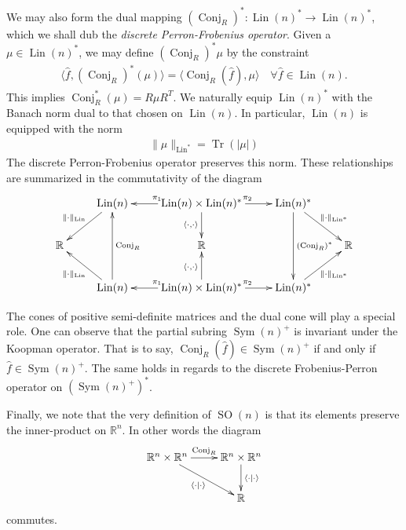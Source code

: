 \documentclass[12pt]{amsart}
\newcommand{\R}{\ensuremath{\mathbb{R}}}
\DeclareMathOperator{\SO}{SO}
\DeclareMathOperator{\Sym}{Sym}
\DeclareMathOperator{\Lin}{Lin}
\DeclareMathOperator{\Tr}{Tr}
\DeclareMathOperator{\Conj}{Conj}
\begin{document}
We may also form the dual mapping $(\Conj_R)^*: \Lin(n)^* \to \Lin(n)^*$,
which we shall dub the \emph{discrete Perron-Frobenius operator}.
Given a $\mu \in \Lin(n)^*$, we may define $(\Conj_{R})^* \mu$ by the constraint
\begin{align*}
	\langle \hat{f} , (\Conj_R)^*(\mu) \rangle = \langle \Conj_R(\hat{f}) , \mu \rangle \quad \forall \hat{f} \in \Lin(n).
\end{align*}
This implies $\Conj_R^*(\mu) = R \mu R^T$.
We naturally equip $\Lin(n)^*$ with the Banach norm dual to that chosen on $\Lin(n)$.
In particular, $\Lin(n)$ is  equipped with the norm
\begin{align*}
	\| \mu \|_{\Lin^*} = \Tr(  |\mu| )
\end{align*}
The discrete Perron-Frobenius operator preserves this norm.
These relationships are summarized in the commutativity of the diagram
\begin{equation*}
	\xymatrix{
		& \ar[dl]_{\| \cdot \|_{\Lin}} \Lin(n) & \ar[l]_{\pi_1} \Lin(n)\times \Lin(n)^* \ar[d]_{\langle \cdot , \cdot \rangle} \ar[r]^{\pi_2} & \Lin(n)^*   \ar[dd]^{(\Conj_R)^*} \ar[dr]^{\| \cdot \|_{\Lin^*}}& \\
		\mathbb{R} && \mathbb{R} && \mathbb{R} \\
		& \ar[ul]^{\| \cdot \|_{\Lin}} \Lin(n) \ar[uu]_{\Conj_R} & \ar[l]_{\pi_1} \Lin(n)\times \Lin(n)^* \ar[u]^{\langle \cdot , \cdot \rangle} \ar[r]^{\pi_2} & \Lin(n)^* \ar[ur]_{\| \cdot \|_{\Lin^*}} &	
	}
\end{equation*}

The cones of positive semi-definite matrices and the dual cone will play a special role.
One can observe that the partial subring $\Sym(n)^+$ is invariant under the Koopman operator.
That is to say, $\Conj_R(\hat{f}) \in \Sym(n)^+$ if and only if $\hat{f} \in \Sym(n)^+$.
The same holds in regards to the discrete Frobenius-Perron operator on $(\Sym(n)^+)^*$.

Finally, we note that the very definition of $\SO(n)$ is that its elements preserve the inner-product on $\R^n$.
In other words the diagram
\begin{equation*}
	\xymatrix{
		\R^n \times \R^n \ar[dr]_{\langle \cdot \mid \cdot \rangle} \ar[r]^{\Conj_R} & \R^n \times \R^n \ar[d]^{\langle \cdot \mid \cdot \rangle} \\
		&\mathbb{R}
	}
\end{equation*}
commutes.
\end{document}
